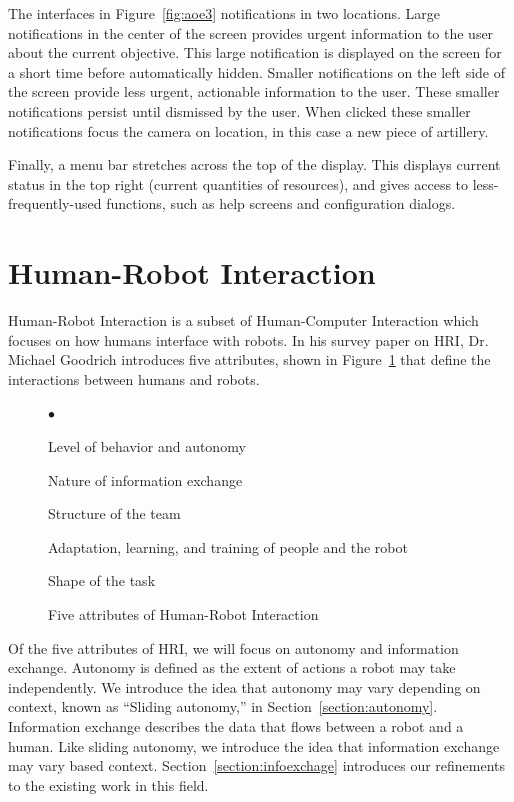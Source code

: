 The interfaces in Figure~\ref{fig:aoe3} notifications in two locations. Large notifications in the center of the screen provides urgent information to the user about the current objective. This large notification is displayed on the screen for a short time before automatically hidden. Smaller notifications on the left side of the screen provide less urgent, actionable information to the user. These smaller notifications persist until dismissed by the user. When clicked these smaller notifications focus the camera on location, in this case a new piece of artillery.

Finally, a menu bar stretches across the top of the display. This displays current status in the top right (current quantities of resources), and gives access to less-frequently-used functions, such as help screens and configuration dialogs.



\section{Human-Robot Interaction}
Human-Robot Interaction is a subset of Human-Computer Interaction which focuses on how humans interface with robots. In his survey paper on HRI, Dr. Michael Goodrich introduces five attributes, shown in Figure~\ref{fig:five-attributes} that define the interactions between humans and robots. \cite{Goodrich_Survey}

\begin{figure}[ht]
	\makebox[\textwidth]{\hrulefill}
	\begin{list}{$\bullet$}
		\item Level of behavior and autonomy
		\item \item Nature of information exchange %
		\item Structure of the team
		\item Adaptation, learning, and training of people and the robot
		\item Shape of the task
	\end{list}
	\makebox[\textwidth]{\hrulefill}
	\caption{Five attributes of Human-Robot Interaction \label{fig:five-attributes}}
\end{figure}

Of the five attributes of HRI, we will focus on autonomy and information exchange. Autonomy is defined as the extent of actions a robot may take independently. We introduce the idea that autonomy may vary depending on context, known as ``Sliding autonomy,'' in Section~\ref{section:autonomy}. Information exchange describes the data that flows between a robot and a human. Like sliding autonomy, we introduce the idea that information exchange may vary based context. Section~\ref{section:infoexchage} introduces our refinements to the existing work in this field.

